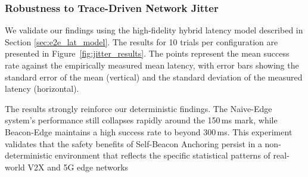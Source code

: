 

\subsubsection{Robustness to Trace-Driven Network Jitter}
\label{sec:jitter_results}
We validate our findings using the high-fidelity hybrid latency model described in Section \ref{sec:e2e_lat_model}. The results for 10 trials per configuration are presented in Figure~\ref{fig:jitter_results}. The points represent the mean success rate against the empirically measured mean latency, with error bars showing the standard error of the mean (vertical) and the standard deviation of the measured latency (horizontal).

The results strongly reinforce our deterministic findings. The Naive-Edge system's performance still collapses rapidly around the 150\,ms mark, while Beacon-Edge maintains a high success rate to beyond 300\,ms. This experiment validates that the safety benefits of Self-Beacon Anchoring persist in a non-deterministic environment that reflects the specific statistical patterns of real-world V2X and 5G edge networks








